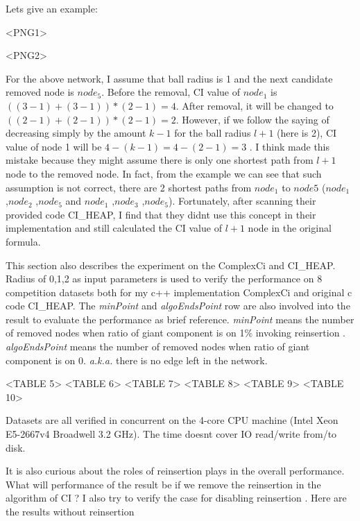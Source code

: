 \documentclass{article}
\begin{document}
	

	Let\textquotesingle s give an example:


	<PNG1>
	
	<PNG2>
	
	
	For the above network, I assume that ball radius is 1 and the next candidate removed node is $node_5$. Before the removal, CI value of $node_1$ is $((3-1)+(3-1))*(2-1)=4$. After removal, it will be changed to $((2-1)+(2-1))*(2-1)=2$. However, if we follow the saying of decreasing simply by the amount $k − 1$ for the ball radius $l + 1$ (here is 2), CI value of node 1 will be $4-(k-1)=4-(2-1)=3$ . I think \cite{morone2016collective} made this mistake because they might assume there is only one shortest path from $l + 1$ node to the removed node. In fact, from the example we can see that such assumption is not correct, there are 2 shortest paths from $node_1$ to $node 5$ ($node_1$ ,$node_2$ ,$node_5$ and $node_1$ ,$node_3$ ,$node_5$). Fortunately, after scanning their provided code CI\_HEAP, I find that they didn\textquotesingle t use this concept in their implementation and still calculated the CI value of $l + 1$ node in the original formula.
	
	This section also describes the experiment on the ComplexCi and CI\_HEAP. Radius of 0,1,2 as input parameters is used to verify the performance on 8 competition datasets both for my c++ implementation ComplexCi and original c code CI\_HEAP. The \textit{minPoint} and \textit{algoEndsPoint} row are also involved into the result to evaluate the performance as brief reference. \textit{minPoint} means the number of removed nodes when ratio of giant component is on 1\% invoking reinsertion . \textit{algoEndsPoint} means the number of removed nodes when ratio of giant component is on 0. \textit{a.k.a.} there is no edge left in the network.
	
	<TABLE 5>
	<TABLE 6>
	<TABLE 7>
	<TABLE 8>
	<TABLE 9>
	<TABLE 10>
	
	Datasets are all verified in concurrent on the 4-core CPU machine (Intel Xeon E5-2667v4 Broadwell 3.2 GHz). The time doesn\textquotesingle t cover IO read/write from/to disk. 
	
	

	It is also curious about the roles of reinsertion plays in the overall performance. What will performance of the result be if we remove the reinsertion in the algorithm of CI ? I also try to verify the case for disabling reinsertion . Here are the results without reinsertion 
	
\end{document}
